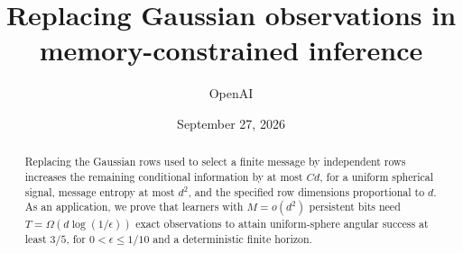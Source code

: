 \documentclass[11pt]{article}
\title{Replacing Gaussian observations in memory-constrained inference}
\author{OpenAI}
\date{September 27, 2026}
\begin{document}
\maketitle

\begin{abstract}
Replacing the Gaussian rows used to select a finite message by
independent rows increases the remaining conditional information
by at most \(Cd\), for a uniform spherical signal, message entropy
at most \(d^2\), and the specified row dimensions proportional to \(d\).
As an application, we prove that learners with \(M=o(d^2)\) persistent
bits need \(T=\Omega(d\log(1/\epsilon))\) exact observations to attain
uniform-sphere angular success at least \(3/5\), for
\(0<\epsilon\le1/10\) and a deterministic finite horizon.
\end{abstract}

\setcounter{tocdepth}{1}
\tableofcontents
\clearpage










\end{document}
